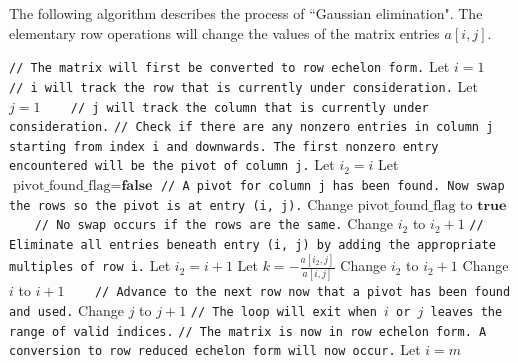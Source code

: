 \documentclass{article}
\begin{document}
The following algorithm describes the process of ``Gaussian elimination". The elementary row operations will change the values of the matrix entries \(a[i,j]\).

\begin{algorithmic}
\STATE \texttt{// The matrix will first be converted to row echelon form.}
\STATE Let \(i = 1\) ~~~ \texttt{// i will track the row that is currently under consideration.}
\STATE Let \(j = 1\) ~~~ \texttt{// j will track the column that is currently under consideration.}
	\STATE \texttt{// Check if there are any nonzero entries in column j starting from index i and downwards. The first nonzero entry encountered will be the pivot of column j.}
	\STATE Let \(i_2 = i\)
	\STATE Let \(\text{pivot\_found\_flag} = \textbf{false}\)
			\STATE \texttt{// A pivot for column j has been found. Now swap the rows so the pivot is at entry (i, j).}
			\STATE Change \(\text{pivot\_found\_flag}\) to \(\textbf{true}\)
			 ~~~ \texttt{// No swap occurs if the rows are the same.}
		\ELSE
			\STATE Change \(i_2\) to \(i_2 + 1\)
		\ENDIF
	\ENDWHILE
		\STATE \texttt{// Eliminate all entries beneath entry (i, j) by adding the appropriate multiples of row i.}
		\STATE Let \(i_2 = i + 1\)
			\STATE Let \(k = -\frac{a[i_2,j]}{a[i,j]}\)
			\STATE Change \(i_2\) to \(i_2 + 1\)
		\ENDWHILE
		\STATE Change \(i\) to \(i + 1\) ~~~ \texttt{// Advance to the next row now that a pivot has been found and used.}
	\ENDIF
	\STATE Change \(j\) to \(j + 1\)
	\STATE \texttt{// The loop will exit when \(i\) or \(j\) leaves the range of valid indices.}
\ENDWHILE
\STATE \texttt{// The matrix is now in row echelon form. A conversion to row reduced echelon form will now occur.}
\STATE Let \(i = m\) 

\end{algorithmic}
\end{document}

